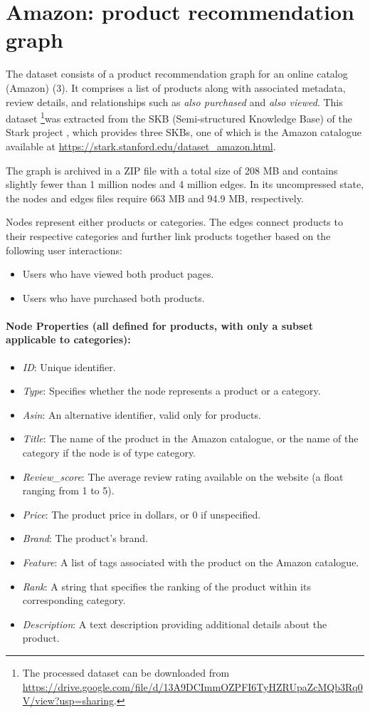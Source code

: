 \section{Amazon: product recommendation graph}

The dataset consists of a product recommendation graph for an online catalog (Amazon) (3). It comprises a list of products along with associated metadata, review details, and relationships such as \textit{also purchased} and \textit{also viewed}. This dataset
\footnote{The processed dataset can be downloaded from \url{https://drive.google.com/file/d/13A9DCImmOZPFI6TyHZRUpaZcMQb3Rq0V/view?usp=sharing}.}was extracted from the SKB (Semi-structured Knowledge Base) of the Stark project \cite{stark2024}, which provides three SKBs, one of which is the Amazon catalogue available at \url{https://stark.stanford.edu/dataset_amazon.html}.

The graph is archived in a ZIP file with a total size of 208 MB and contains slightly fewer than 1 million nodes and 4 million edges. In its uncompressed state, the nodes and edges files require 663 MB and 94.9 MB, respectively.

Nodes represent either products or categories. The edges connect products to their respective categories and further link products together based on the following user interactions:
\begin{itemize}
    \item Users who have viewed both product pages.
    \item Users who have purchased both products.
\end{itemize}

\paragraph{Node Properties (all defined for products, with only a subset applicable to categories):}
\begin{itemize}
    \item \emph{ID}: Unique identifier.
    \item \emph{Type}: Specifies whether the node represents a product or a category.
    \item \emph{Asin}: An alternative identifier, valid only for products.
    \item \emph{Title}: The name of the product in the Amazon catalogue, or the name of the category if the node is of type category.
    \item \emph{Review\_score}: The average review rating available on the website (a float ranging from 1 to 5).
    \item \emph{Price}: The product price in dollars, or 0 if unspecified.
    \item \emph{Brand}: The product's brand.
    \item \emph{Feature}: A list of tags associated with the product on the Amazon catalogue.
    \item \emph{Rank}: A string that specifies the ranking of the product within its corresponding category.
    \item \emph{Description}: A text description providing additional details about the product.
\end{itemize}

